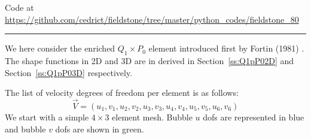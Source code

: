 

\begin{center}
Code at \url{https://github.com/cedrict/fieldstone/tree/master/python_codes/fieldstone_80}
\end{center}

\par\noindent\rule{\textwidth}{0.4pt}

We here consider the enriched $Q_1\times P_0$ element introduced first by Fortin (1981) \cite{fort81}.
The shape functions in 2D and 3D are in derived in Section~\ref{ss:Q1pP02D} and Section~\ref{ss:Q1pP03D} respectively.

The list of velocity degrees of freedom per element is as follows:
\[
\vec{V} = (u_1,v_1,u_2,v_2,u_3,v_3,u_4,v_4,u_5,v_5,u_6,v_6)
\]
We start with a simple $4\times 3$ element mesh. 
Bubble $u$ dofs are represented in blue and bubble $v$ dofs are shown in green.


